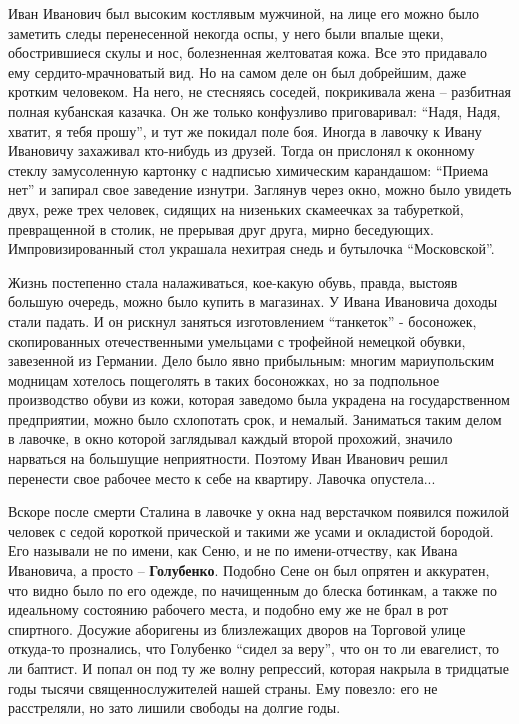 Иван Иванович был высоким костлявым мужчиной, на лице его можно было заметить
следы перенесенной некогда оспы, у него были впалые щеки, обострившиеся скулы и
нос, болезненная желтоватая кожа. Все это придавало ему сердито-мрачноватый
вид. Но на самом деле он был добрейшим, даже кротким человеком. На него, не
стесняясь соседей, покрикивала жена – разбитная полная кубанская казачка. Он же
только конфузливо приговаривал: \enquote{Надя, Надя, хватит, я тебя прошу}, и тут же
покидал поле боя. Иногда в лавочку к Ивану Ивановичу захаживал кто-нибудь из
друзей. Тогда он прислонял к оконному стеклу замусоленную картонку с надписью
химическим карандашом: \enquote{Приема нет} и запирал свое заведение изнутри. Заглянув
через окно, можно было увидеть двух, реже трех человек, сидящих на низеньких
скамеечках за табуреткой, превращенной в столик, не прерывая друг друга, мирно
беседующих. Импровизированный стол украшала нехитрая снедь и бутылочка
\enquote{Московской}. 

Жизнь постепенно стала налаживаться, кое-какую обувь, правда, выстояв большую
очередь, можно было купить в магазинах. У Ивана Ивановича доходы стали падать.
И он рискнул заняться изготовлением \enquote{танкеток} - босоножек, скопированных
отечественными умельцами с трофейной немецкой обувки, завезенной из Германии.
Дело было явно прибыльным: многим мариупольским модницам хотелось пощеголять в
таких босоножках, но за подпольное производство обуви из кожи, которая заведомо
была украдена на государственном предприятии, можно было схлопотать срок, и
немалый. Заниматься таким делом в лавочке, в окно которой заглядывал каждый
второй прохожий, значило нарваться на большущие неприятности. Поэтому Иван
Иванович решил перенести свое рабочее место к себе на квартиру. Лавочка
опустела...

Вскоре после смерти Сталина в лавочке у окна над верстачком появился пожилой
человек с седой короткой прической и такими же усами и окладистой бородой. Его
называли не по имени, как Сеню, и не по имени-отчеству, как Ивана Ивановича, а
просто – \textbf{Голубенко}. Подобно Сене он был опрятен и аккуратен, что видно было по
его одежде, по начищенным до блеска ботинкам, а также по идеальному состоянию
рабочего места, и подобно ему же не брал в рот спиртного. Досужие аборигены из
близлежащих дворов на Торговой улице откуда-то прознались, что Голубенко \enquote{сидел
за веру}, что он то ли евагелист, то ли баптист. И попал он под ту же волну
репрессий, которая накрыла в тридцатые годы тысячи священнослужителей нашей
страны. Ему повезло: его не расстреляли, но зато лишили свободы на долгие годы. 

